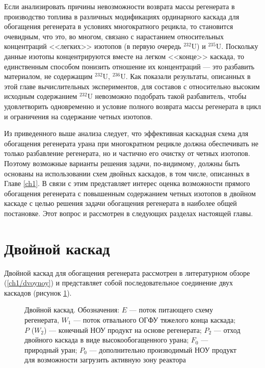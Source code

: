 Если анализировать причины невозможности возврата массы регенерата в производство топлива в различных модификациях ординарного каскада для обогащения регенерата в условиях многократного рецикла, то становится очевидным, что это, во многом, связано с нарастанием относительных концентраций <<легких>> изотопов (в первую очередь $^{232}$U) и $^{235}$U. Поскольку данные изотопы концентрируются вместе на легком <<конце>> каскада, то единственным способом понизить отношение их концентраций --- это разбавить материалом, не содержащим $^{232}$U, $^{236}$U. Как показали результаты, описанных в этой главе вычислительных экспериментов, для составов с относительно высоким исходным содержанием $^{232}$U невозможно подобрать такой разбавитель, чтобы удовлетворить одновременно и условие полного возврата массы регенерата в цикл и ограничения на содержание четных изотопов.

Из приведенного выше анализа следует, что эффективная каскадная схема для обогащения регенерата урана при многократном рецикле должна обеспечивать не только разбавление регенерата, но и частично его очистку от четных изотопов. Поэтому возможные варианты решения задачи, по-видимому, должны быть основаны на использовании схем двойных каскадов, в том числе, описанных в Главе \ref{ch1}. В связи с этим представляет интерес оценка возможности прямого обогащения регенерата с повышенным содержанием четных изотопов в двойном каскаде с целью решения задачи обогащения регенерата в наиболее общей постановке. Этот вопрос и рассмотрен в следующих разделах настоящей главы.

\section{Двойной каскад}\label{sec:ch2/dvoynoy}

Двойной каскад для обогащения регенерата рассмотрен в литературном обзоре (\ref{ch1/dvoynoy}) и представляет собой последовательное соединение двух каскадов (рисунок \ref{fig:double_ru_in3}). 

\begin{figure}[ht]
  \caption{Двойной каскад. Обозначения: $E$ --- поток питающего схему регенерата, $W_1$ --- поток отвального ОГФУ тяжелого конца каскада; $P$ ($W_2$) --- конечный НОУ продукт на основе регенерата; $P_2$ --- отход двойного каскада в виде высокообогащенного урана; $F_0$ --- природный уран; $P_0$ --- дополнительно производимый НОУ продукт для возможности загрузить активную зону реактора}\label{fig:double_ru_in3}
\end{figure}

